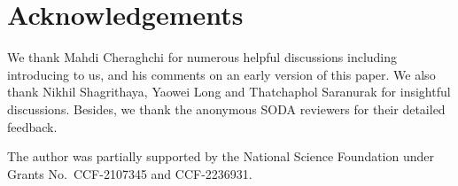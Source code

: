 \documentclass[11pt,letterpaper]{article}
\begin{document}








\section*{Acknowledgements}
We thank Mahdi Cheraghchi for numerous helpful discussions including introducing \cite{lpsbook} to us, and his comments on an early version of this paper. We also thank Nikhil Shagrithaya, Yaowei Long and Thatchaphol Saranurak for insightful discussions. Besides, we thank the anonymous SODA reviewers for their detailed feedback.

The author was partially supported by the National Science Foundation under Grants No.\ CCF-2107345 and CCF-2236931.
{\small }
\appendix



\listoffixmes
\end{document}
